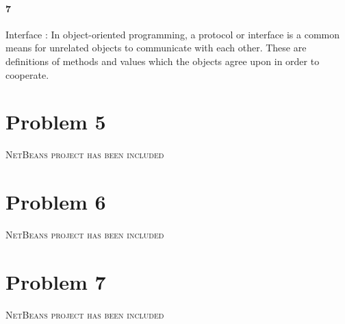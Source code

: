 \documentclass{article}
\begin{document}
\paragraph{7}
Interface : In object-oriented programming, a protocol or interface is a common means for unrelated objects to communicate with each other. These are definitions of methods and values which the objects agree upon in order to cooperate.
\section{Problem 5}
\textsc{NetBeans project has been included}
\section{Problem 6}
\textsc{NetBeans project has been included}
\section{Problem 7}
\textsc{NetBeans project has been included}
\end{document}
